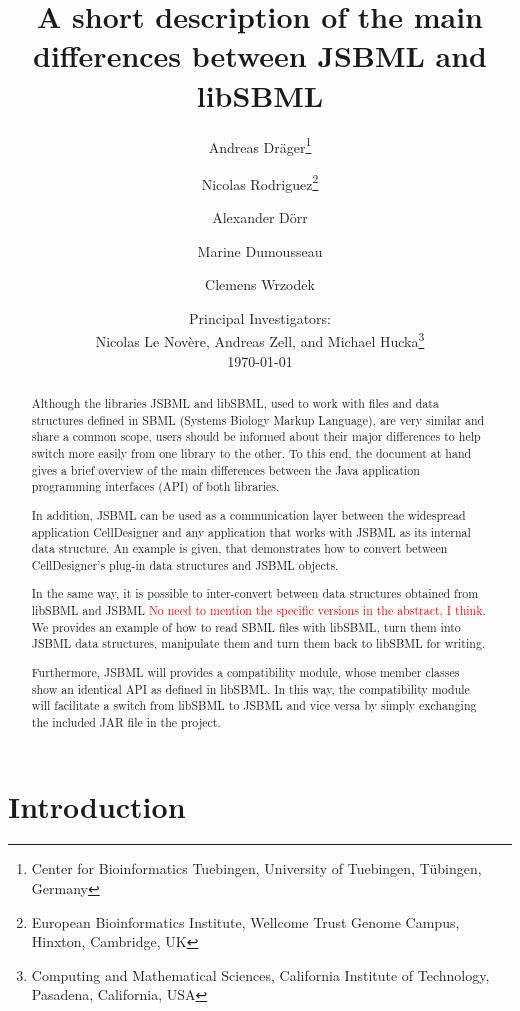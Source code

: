 \documentclass[
  BCOR12mm,
  letterpaper,
  11pt,
  headsepline,
  pointlessnumbers,
  tablecaptionabove,
  onelinecaption,
  headinclude,
  appendixprefix,
  idxtotoc,
  bibtotoc,
  twoside,
  titlepage
]{scrartcl}
\title{A short description of the main differences between JSBML and libSBML}
\author{Andreas Dr\"ager\thanks{Center for Bioinformatics Tuebingen, University
of Tuebingen, T\"ubingen, Germany}\and%
Nicolas Rodriguez\thanks{European Bioinformatics Institute, Wellcome Trust
Genome Campus, Hinxton, Cambridge, UK}\and%
Alexander D\"orr\footnotemark[1]\and%
Marine Dumousseau\footnotemark[2]\and%
Clemens Wrzodek\footnotemark[1]}
\date{Principal Investigators:\\
Nicolas Le Nov{\`e}re\footnotemark[2], Andreas Zell\footnotemark[1], and Michael
Hucka\thanks{Computing and Mathematical Sciences, California Institute of
Technology, Pasadena, California, USA}\\[4ex]
\today}
\begin{document}
\maketitle

\begin{abstract}
Although the libraries JSBML and libSBML, used to work with files and data
structures defined in SBML (Systems Biology Markup Language), are
very similar and share a common scope, users should be informed about their
major differences to help switch more easily from one library to the other. To
this end, the document at hand gives a brief overview of the main differences
between the Java\texttrademark{} application programming interfaces (API) of
both libraries.

In addition, JSBML can be used as a communication layer between the widespread
application CellDesigner and any application that works with JSBML as its
internal data structure. An example is given, that demonstrates how to
convert between CellDesigner's plug-in data structures and JSBML objects.

In the same way, it is possible to inter-convert between data structures
obtained from libSBML and JSBML \textcolor{red}{No need to mention the
specific versions in the abstract, I think}. We provides an example of how to
read SBML files with libSBML, turn them into JSBML data structures, manipulate
 them and turn them back to libSBML for writing.

Furthermore, JSBML will provides a compatibility module, whose member classes
show an identical API as defined in libSBML. In this way, the
compatibility module will facilitate a switch from libSBML to JSBML and vice
versa by simply exchanging the included JAR file in the project.



\end{abstract}


\tableofcontents

\section{Introduction}
\end{document}

